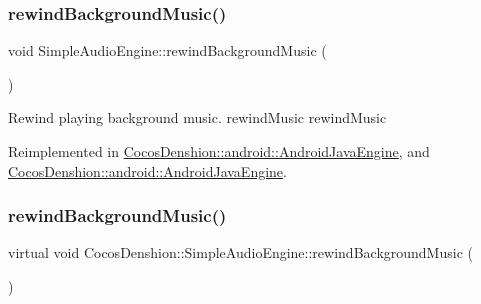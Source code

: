 \mbox{\label{classCocosDenshion_1_1SimpleAudioEngine_ab91dfde414f3ef20ccd891e59ba5a67d}} 
\subsubsection{\texorpdfstring{rewind\+Background\+Music()}{rewindBackgroundMusic()}\hspace{0.1cm}{\footnotesize\ttfamily [1/2]}}
{\footnotesize\ttfamily void Simple\+Audio\+Engine\+::rewind\+Background\+Music (\begin{DoxyParamCaption}{ }\end{DoxyParamCaption})\hspace{0.3cm}{\ttfamily [virtual]}}

Rewind playing background music.  rewind\+Music  rewind\+Music 

Reimplemented in \hyperlink{classCocosDenshion_1_1android_1_1AndroidJavaEngine_a65e37b788d03eff041fcb72754c2ed23}{Cocos\+Denshion\+::android\+::\+Android\+Java\+Engine}, and \hyperlink{classCocosDenshion_1_1android_1_1AndroidJavaEngine_a7c1e7ad61fe524b331c21c924141a34e}{Cocos\+Denshion\+::android\+::\+Android\+Java\+Engine}.

\mbox{\label{classCocosDenshion_1_1SimpleAudioEngine_a326582ffb6fe413f2b5dc0d5878699ff}} 
\subsubsection{\texorpdfstring{rewind\+Background\+Music()}{rewindBackgroundMusic()}\hspace{0.1cm}{\footnotesize\ttfamily [2/2]}}
{\footnotesize\ttfamily virtual void Cocos\+Denshion\+::\+Simple\+Audio\+Engine\+::rewind\+Background\+Music (\begin{DoxyParamCaption}{ }\end{DoxyParamCaption})\hspace{0.3cm}{\ttfamily [virtual]}}

